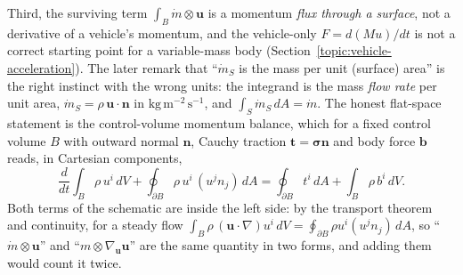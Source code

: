 Third, the surviving term $\int_B\dot m\otimes\mathbf u$ is a momentum
\emph{flux through a surface}, not a derivative of a vehicle's momentum, and
the vehicle-only $F=d(Mu)/dt$ is not a correct starting point for a
variable-mass body (Section~\ref{topic:vehicle-acceleration}). The later
remark that ``$\dot m_S$ is the mass per unit (surface)
area'' is the right instinct with the wrong units: the integrand is the mass
\emph{flow rate} per unit area, $\dot m_S=\rho\,\mathbf u\cdot\mathbf n$ in
$\mathrm{kg\,m^{-2}\,s^{-1}}$, and $\int_S\dot m_S\,dA=\dot m$. The honest
flat-space statement is the control-volume momentum balance, which for a fixed
control volume $B$ with outward normal $\mathbf n$, Cauchy traction
$\mathbf t=\boldsymbol\sigma\mathbf n$ and body force $\mathbf b$ reads, in
Cartesian components,
\begin{equation}\label{Eq:ControlVolumeMomentumBalance}
 \frac{d}{dt}\int_B\rho\,u^i\,dV
 +\oint_{\partial B}\rho\,u^i\,(u^jn_j)\,dA
 =\oint_{\partial B}t^i\,dA+\int_B\rho\,b^i\,dV .
\end{equation}
Both terms of the schematic are inside the left side: by the
transport theorem and continuity, for a steady flow
$\int_B\rho\,(\mathbf u\cdot\nabla)u^i\,dV=\oint_{\partial B}\rho u^i(u^jn_j)\,dA$,
so ``$\dot m\otimes\mathbf u$'' and ``$m\otimes\nabla_{\mathbf u}\mathbf u$''
are the same quantity in two forms, and adding them would count it twice.

